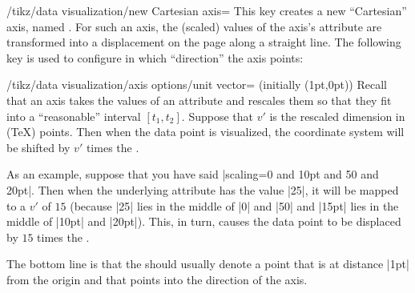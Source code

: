 \begin{key}{/tikz/data visualization/new Cartesian axis=}
  This key creates a new ``Cartesian'' axis, named . For
  such an axis, the (scaled) values of the axis's attribute are
  transformed into a displacement on the page along a straight
  line. The following key is used to configure in which ``direction''
  the axis points:
  \begin{key}{/tikz/data visualization/axis options/unit
      vector= (initially {(1pt,0pt)})}
    Recall that an axis takes the values of an attribute and rescales
    them so that they fit into a ``reasonable'' interval
    $[t_1,t_2]$. Suppose that $v'$ is the rescaled dimension in (\TeX)
    points. Then when the data point is visualized, the coordinate
    system will be shifted by $v'$ times the .

    As an example, suppose that you have said
    |scaling=0 and 10pt and 50 and 20pt|. Then when the underlying
    attribute has the value |25|, it will be mapped to a $v'$ of $15$
    (because |25| lies in the middle of |0| and |50| and |15pt| lies
    in the middle of |10pt| and |20pt|). This, in turn, causes the
    data point to be displaced by $15$ times the .

    The bottom line is that the  should usually
    denote a point that is at distance |1pt| from the origin and that
    points into the direction of the axis.
\begin{codeexample}[]
\end{codeexample}
\end{key}
\end{key}


